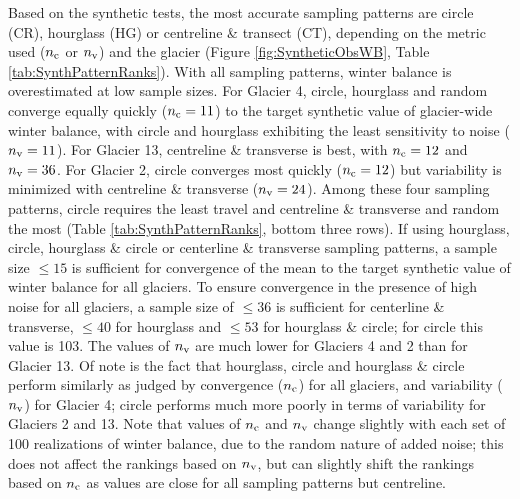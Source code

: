 \documentclass{article}
\begin{document}
Based on the synthetic tests, the most accurate sampling patterns are circle (CR), hourglass (HG) or centreline \& transect (CT), depending on the metric used ($n_{\rm c}$ or $n_{\rm v}$) and the glacier (Figure \ref{fig:SyntheticObsWB}, Table \ref{tab:SynthPatternRanks}). 
With all sampling patterns, winter balance is overestimated at low sample sizes.
For Glacier 4, circle, hourglass and random converge equally quickly ($n_{\rm c}=11$) to the target synthetic value of glacier-wide winter balance, with circle and hourglass exhibiting the least sensitivity to noise ($n_{\rm v}=11$). For Glacier 13, centreline \& transverse is best, with $n_{\rm c}=12$ and $n_{\rm v}=36$. For Glacier 2, circle converges most quickly ($n_{\rm c}=12$) but variability is minimized with centreline \& transverse ($n_{\rm v}=24$). Among these four sampling patterns, circle requires the least travel and centreline \& transverse and random the most (Table \ref{tab:SynthPatternRanks}, bottom three rows). 
If using hourglass, circle, hourglass \& circle or centerline \& transverse sampling patterns, a sample size $\leq 15$ is sufficient for convergence of the mean to the target synthetic value of winter balance for all glaciers. 
To ensure convergence in the presence of high noise for all glaciers, a sample size of  $\leq 36$ is sufficient for centerline \& transverse, $ \leq 40$ for hourglass and $\leq 53$ for hourglass \& circle; for circle this value is 103. 
The values of $n_{\rm v}$ are much lower for Glaciers 4 and 2 than for Glacier 13.   
Of note is the fact that hourglass, circle and hourglass \& circle perform similarly as judged by convergence ($n_{\rm c}$) for all glaciers, and variability ($n_{\rm v}$) for Glacier 4; circle performs much more poorly in terms of variability for Glaciers 2 and 13. Note that values of $n_{\rm c}$ and $n_{\rm v}$ change slightly with each set of 100 realizations of winter balance, due to the random nature of added noise; this does not affect the rankings based on $n_{\rm v}$, but can slightly shift the rankings based on $n_{\rm c}$ as values are close for all sampling patterns but centreline.  
\end{document}
